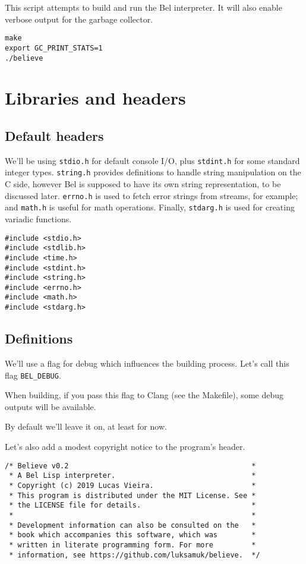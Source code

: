 \documentclass[openright,a4paper,twoside,12pt]{memoir}
\begin{document}
This script attempts to build and run the Bel interpreter. It will
also enable verbose output for the garbage collector.

\begin{verbatim}
make
export GC_PRINT_STATS=1
./believe
\end{verbatim}

\chapter{Libraries and headers}
\label{sec:org17931f3}

\section{Default headers}
\label{sec:orgd5d032c}

We'll be using \texttt{stdio.h} for default console I/O, plus \texttt{stdint.h} for some
standard integer types. \texttt{string.h} provides definitions to handle string
manipulation on the C side, however Bel is supposed to have its own
string representation, to be discussed later. \texttt{errno.h} is used to fetch
error strings from streams, for example; and \texttt{math.h} is useful for math
operations. Finally, \texttt{stdarg.h} is used for creating variadic
functions.

\begin{verbatim}
#include <stdio.h>
#include <stdlib.h>
#include <time.h>
#include <stdint.h>
#include <string.h>
#include <errno.h>
#include <math.h>
#include <stdarg.h>
\end{verbatim}

\section{Definitions}
\label{sec:org59b1cfe}

We'll use a flag for debug which influences the building
process. Let's call this flag \texttt{BEL\_DEBUG}.

When building, if you pass this flag to Clang (see the Makefile), some
debug outputs will be available.

By default we'll leave it on, at least for now.

Let's also add a modest copyright notice to the program's header.

\begin{verbatim}
/* Believe v0.2                                           *
 * A Bel Lisp interpreter.                                *
 * Copyright (c) 2019 Lucas Vieira.                       *
 * This program is distributed under the MIT License. See *
 * the LICENSE file for details.                          *
 *                                                        *
 * Development information can also be consulted on the   *
 * book which accompanies this software, which was        * 
 * written in literate programming form. For more         *
 * information, see https://github.com/luksamuk/believe.  */
\end{verbatim}
\end{document}
